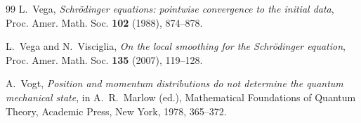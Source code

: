 \documentclass[11pt]{amsart}
\theoremstyle{remark}
\newcommand{\1}{\mathbf 1}
\begin{document}
\begin{thebibliography}{99}
L.~Vega,
\emph{Schr\"odinger equations: pointwise convergence to the initial data},
Proc. Amer. Math. Soc. \textbf{102} (1988), 874--878.

L.~Vega and N.~Visciglia,
\emph{On the local smoothing for the Schr\"odinger equation},
Proc. Amer. Math. Soc. \textbf{135} (2007), 119--128.

A.~Vogt,
\emph{Position and momentum distributions do not determine the quantum mechanical state},
in A.~R.~Marlow (ed.), Mathematical Foundations of Quantum Theory,
Academic Press, New York, 1978, 365--372.

\end{thebibliography}
\end{document}

